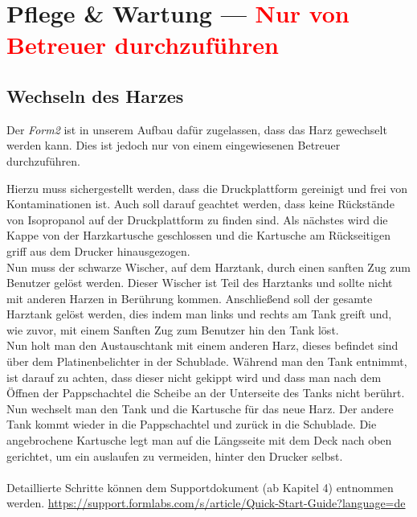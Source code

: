 \documentclass{\basedir/fablab-document}
\begin{document}

\section{Pflege \& Wartung --- \textcolor{red}{Nur von Betreuer durchzuführen}}

\subsection{Wechseln des Harzes}
Der \textit{Form2} ist in unserem Aufbau dafür zugelassen, dass das Harz gewechselt werden kann. Dies ist jedoch nur von einem eingewiesenen Betreuer durchzuführen. 

Hierzu muss sichergestellt werden, dass die Druckplattform gereinigt und frei von Kontaminationen ist. Auch soll darauf geachtet werden, dass keine Rückstände von Isopropanol auf der Druckplattform zu finden sind. Als nächstes wird die Kappe von der Harzkartusche geschlossen und die Kartusche am Rückseitigen griff aus dem Drucker hinausgezogen.\\
Nun muss der schwarze Wischer, auf dem Harztank, durch einen sanften Zug zum Benutzer gelöst werden. Dieser Wischer ist Teil des Harztanks und sollte nicht mit anderen Harzen in Berührung kommen. Anschließend soll der gesamte Harztank gelöst werden, dies indem man links und rechts am Tank greift und, wie zuvor, mit einem Sanften Zug zum Benutzer hin den Tank löst. \\
Nun holt man den Austauschtank mit einem anderen Harz, dieses befindet sind über dem Platinenbelichter in der Schublade. Während man den Tank entnimmt, ist darauf zu achten, dass dieser nicht gekippt wird und dass man nach dem Öffnen der Pappschachtel die Scheibe an der Unterseite des Tanks nicht berührt. \\
Nun wechselt man den Tank und die Kartusche für das neue Harz. Der andere Tank kommt wieder in die Pappschachtel und zurück in die Schublade. Die angebrochene Kartusche legt man auf die Längsseite mit dem Deck nach oben gerichtet, um ein auslaufen zu vermeiden, hinter den Drucker selbst. \\
\\
Detaillierte Schritte können dem Supportdokument (ab Kapitel 4) entnommen werden. 
\url{https://support.formlabs.com/s/article/Quick-Start-Guide?language=de}
\end{document}

